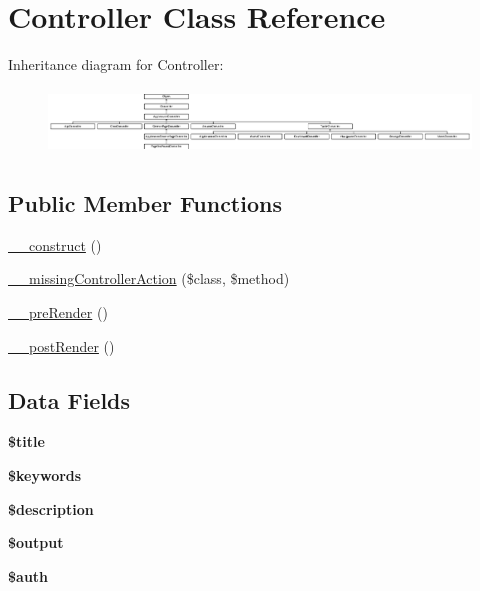 \hypertarget{class_controller}{
\section{Controller Class Reference}
\label{class_controller}
}
Inheritance diagram for Controller:\begin{figure}[H]
\begin{center}
\leavevmode
\includegraphics[height=1.752739cm]{class_controller}
\end{center}
\end{figure}
\subsection*{Public Member Functions}
\begin{DoxyCompactItemize}
\item 
\hyperlink{class_controller_a095c5d389db211932136b53f25f39685}{\_\-\_\-construct} ()
\item 
\hyperlink{class_controller_a728c573e418d1f979340a4669524cacd}{\_\-\_\-missingControllerAction} (\$class, \$method)
\item 
\hyperlink{class_controller_ad86994d2463ea27cab892176e6509bdb}{\_\-\_\-preRender} ()
\item 
\hyperlink{class_controller_adc3c9cc4788f7ba7d1368fdc43568b1d}{\_\-\_\-postRender} ()
\end{DoxyCompactItemize}
\subsection*{Data Fields}
\begin{DoxyCompactItemize}
\item 
\hypertarget{class_controller_ada57e7bb7c152edad18fe2f166188691}{
{\bfseries \$title}}
\label{class_controller_ada57e7bb7c152edad18fe2f166188691}

\item 
\hypertarget{class_controller_a9fbd95bfcdf27d802a8c7938529a61ba}{
{\bfseries \$keywords}}
\label{class_controller_a9fbd95bfcdf27d802a8c7938529a61ba}

\item 
\hypertarget{class_controller_a87b032cba06009e3467abf1c8018d960}{
{\bfseries \$description}}
\label{class_controller_a87b032cba06009e3467abf1c8018d960}

\item 
\hypertarget{class_controller_a73004ce9cd673c1bfafd1dc351134797}{
{\bfseries \$output}}
\label{class_controller_a73004ce9cd673c1bfafd1dc351134797}

\item 
\hypertarget{class_controller_a20d7415a9c3391b32d7fe2136fce6e2c}{
{\bfseries \$auth}}
\label{class_controller_a20d7415a9c3391b32d7fe2136fce6e2c}

\end{DoxyCompactItemize}
